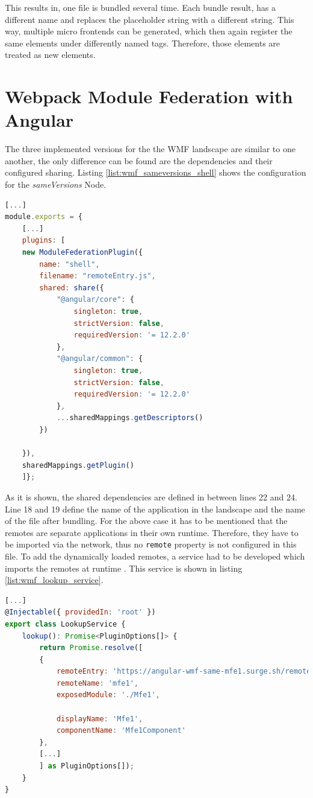 This results in, one file is bundled several time. Each bundle result, has a different name and replaces the placeholder string with a different string. This way, multiple micro frontends can be generated, which then again register the same elements under differently named tags. Therefore, those elements are treated as new elements.

\section{Webpack Module Federation with Angular} 
\label{wmf_implementation_prototype}

The three implemented versions for the the WMF landscape are similar to one another, the only difference can be found are the dependencies and their configured sharing. Listing \ref{list:wmf_sameversions_shell} shows the configuration for the \textit{sameVersions} Node.

\begin{lstlisting}[language=JavaScript, caption=Content of \texttt{webpack.config.js} of the shell of the sameVersions WMF project, label=list:wmf_sameversions_shell, xleftmargin=.0\textwidth, xrightmargin=.0\textwidth]
[...]
module.exports = {
	[...]
	plugins: [
	new ModuleFederationPlugin({
		name: "shell",
		filename: "remoteEntry.js",
		shared: share({
			"@angular/core": { 
				singleton: true, 
				strictVersion: false, 
				requiredVersion: '= 12.2.0'
			},
			"@angular/common": { 
				singleton: true, 
				strictVersion: false, 
				requiredVersion: '= 12.2.0' 
			},
			...sharedMappings.getDescriptors()
		})
		
	}),
	sharedMappings.getPlugin()
	]};
\end{lstlisting}

As it is shown, the shared dependencies are defined in between lines 22 and 24. Line 18 and 19 define the name of the application in the landscape and the name of the file after bundling. For the above case it has to be mentioned that the remotes are separate applications in their own runtime. Therefore, they have to be imported via the network, thus no \texttt{remote} property is not configured in this file. To add the dynamically loaded remotes, a service had to be developed which imports the remotes at runtime \cite{wmf_angular_dynamicfederation}. This service is shown in listing \ref{list:wmf_lookup_service}.

\begin{lstlisting}[language=JavaScript, caption=Content of \texttt{lookup.service.ts} for remote module loading in shell applications, label=list:wmf_lookup_service,  xleftmargin=.01\textwidth, xrightmargin=.01\textwidth]
[...]
@Injectable({ providedIn: 'root' })
export class LookupService {
	lookup(): Promise<PluginOptions[]> {
		return Promise.resolve([
		{
			remoteEntry: 'https://angular-wmf-same-mfe1.surge.sh/remoteEntry.js',
			remoteName: 'mfe1',
			exposedModule: './Mfe1',
			
			displayName: 'Mfe1',
			componentName: 'Mfe1Component'
		},
		[...]	
		] as PluginOptions[]);
	}
}
\end{lstlisting}

